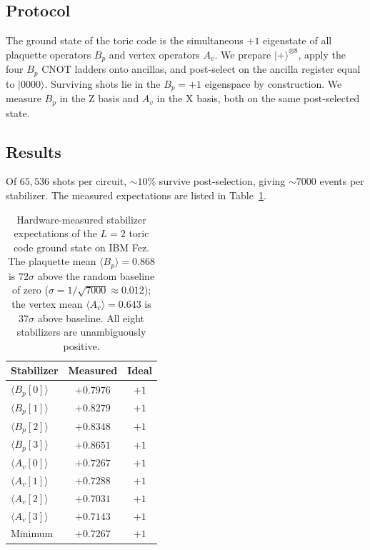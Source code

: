 \documentclass[11pt,aps,prl,twocolumn]{revtex4-2}
\begin{document}
\subsection{Protocol}

The ground state of the toric code is the simultaneous $+1$
eigenstate of all plaquette operators $B_p$ and vertex operators
$A_v$.  We prepare $|{+}\rangle^{\otimes 8}$, apply the four
$B_p$ CNOT ladders onto ancillas, and post-select on the ancilla
register equal to $|0000\rangle$.  Surviving shots lie in the
$B_p = +1$ eigenspace by construction.  We measure $B_p$ in the
Z basis and $A_v$ in the X basis, both on the same post-selected
state.

\subsection{Results}

Of $65{,}536$ shots per circuit, $\sim 10\%$ survive
post-selection, giving $\sim 7000$ events per stabilizer.  The
measured expectations are listed in Table~\ref{tab:hardware}.

\begin{table}[h]
\centering
\begin{tabular}{lcc}
\hline
Stabilizer & Measured & Ideal \\
\hline
$\langle B_p[0] \rangle$ & $+0.7976$ & $+1$ \\
$\langle B_p[1] \rangle$ & $+0.8279$ & $+1$ \\
$\langle B_p[2] \rangle$ & $+0.8348$ & $+1$ \\
$\langle B_p[3] \rangle$ & $+0.8651$ & $+1$ \\
\hline
$\langle A_v[0] \rangle$ & $+0.7267$ & $+1$ \\
$\langle A_v[1] \rangle$ & $+0.7288$ & $+1$ \\
$\langle A_v[2] \rangle$ & $+0.7031$ & $+1$ \\
$\langle A_v[3] \rangle$ & $+0.7143$ & $+1$ \\
\hline
Minimum              & $+0.7267$ & $+1$ \\
\hline
\end{tabular}
\caption{Hardware-measured stabilizer expectations of the
$L = 2$ toric code ground state on IBM Fez.  The plaquette
mean $\langle B_p \rangle = 0.868$ is $72\sigma$ above the random
baseline of zero ($\sigma = 1/\sqrt{7000} \approx 0.012$); the
vertex mean $\langle A_v \rangle = 0.643$ is $37\sigma$ above
baseline.  All eight stabilizers are unambiguously positive.}
\label{tab:hardware}
\end{table}
\end{document}
